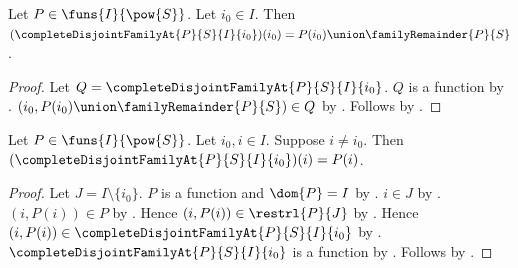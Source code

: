 \begin{proposition}\label{complete_disjoint_family_at_selected}
    Let $P\in\funs{I}{\pow{S}}$.
    Let $i_0\in I$.
    Then $(\completeDisjointFamilyAt{P}{S}{I}{i_0})(i_0)
        =P(i_0)\union\familyRemainder{P}{S}$.
\end{proposition}
\begin{proof}
    Let $Q=\completeDisjointFamilyAt{P}{S}{I}{i_0}$.
    $Q$ is a function by
        .
    $(i_0,P(i_0)\union\familyRemainder{P}{S})\in Q$
        by .
    Follows by .
\end{proof}

\begin{proposition}\label{complete_disjoint_family_at_other}
    Let $P\in\funs{I}{\pow{S}}$.
    Let $i_0,i\in I$.
    Suppose $i\neq i_0$.
    Then $(\completeDisjointFamilyAt{P}{S}{I}{i_0})(i)=P(i)$.
\end{proposition}
\begin{proof}
    Let $J=I\setminus\{i_0\}$.
    $P$ is a function and $\dom{P}=I$
        by .
    $i\in J$ by .
    $(i,P(i))\in P$ by .
    Hence $(i,P(i))\in\restrl{P}{J}$ by .
    Hence $(i,P(i))\in\completeDisjointFamilyAt{P}{S}{I}{i_0}$
        by .
    $\completeDisjointFamilyAt{P}{S}{I}{i_0}$ is a function
        by .
    Follows by .
\end{proof}

